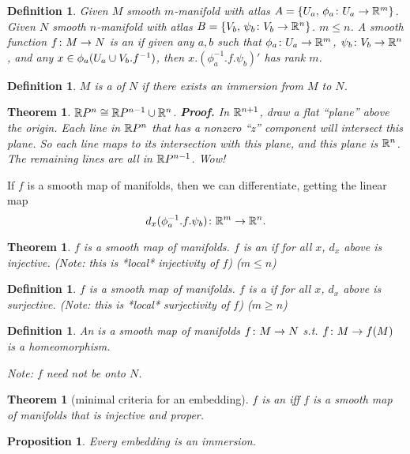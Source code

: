 \documentclass[11pt]{amsbook}
\theoremstyle{mystyle} %
\newtheorem{thrm}[thm]{Theorem}
\newtheorem{defi}[thm]{Definition}
\newtheorem{propo}[thm]{Proposition}
\numberwithin{thm}{section}
\begin{document}
\begin{defi}
	Given $M$ smooth $m$-manifold with atlas $A = \{ U_a, \,\phi_a \colon U_a \to {\mathbb R}^m \}$.
	Given $N$ smooth $n$-manifold with atlas $B = \{ V_b, \,\psi_b \colon V_b \to {\mathbb R}^n \}$.
	$m \leq n$.
	A smooth function $f \colon M \to N$  is an  if given any $a, b$ such that $\phi_a\colon U_a \to {\mathbb R}^m$, $\psi_b\colon V_b \to {\mathbb R}^n$, and any $x \in \phi_a(U_a \cup V_b.f^{-1})$, then $x.(\phi_a^{-1}.f.\psi_b)'$ has rank $m$.
\end{defi}

\begin{defi}
	$M$ is a  of $N$ if there exists an immersion from $M$ to $N$.
\end{defi}

\begin{thrm}
	${\mathbb R} P^n \mathrel{\cong} {\mathbb R} P^{n-1} \cup {\mathbb R}^n$.
	\textbf{Proof.}  In ${\mathbb R}^{n+1}$, draw a flat ``plane'' above the origin.  Each line in ${\mathbb R} P^n$ that has a nonzero ``z'' component will intersect this plane.  So each line maps to its intersection with this plane, and this plane is ${\mathbb R}^n$.  The remaining lines are all in ${\mathbb R} P^{n-1}$.  Wow!
\end{thrm}



If $f$ is a smooth map of manifolds, then we can differentiate, getting the linear map $$d_x(\phi_a^{-1}.f.\psi_b)\colon {\mathbb R}^m \to {\mathbb R}^n.$$

\begin{thrm}
	$f$ is a smooth map of manifolds.
	$f$ is an  if for all $x$, $d_x$ above is injective.  (Note: this is *local* injectivity of $f$) ($m \leq n$)
\end{thrm}

\begin{defi}
	$f$ is a smooth map of manifolds.
	$f$ is a  if for all $x$, $d_x$ above is surjective.  (Note: this is *local* surjectivity of $f$) ($m \geq n$)
\end{defi}

\begin{defi}
	An  is a smooth map of manifolds $f\colon M \to N$ s.t. $f \colon M \to f(M)$ is a homeomorphism.

	Note: $f$ need not be onto $N$.
\end{defi}
\begin{thrm}[minimal criteria for an embedding]
	$f$ is an  iff $f$ is a smooth map of manifolds that is injective and proper.
\end{thrm}
\begin{propo}
	Every embedding is an immersion.
\end{propo}
\end{document}
